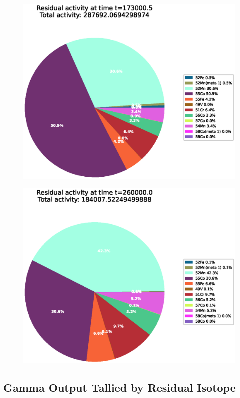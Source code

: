\begin{figure}[!htb]
\centering
\includegraphics[width=0.8\linewidth]{chapters/results_activity_code/fe-activity-v2/residual-activity/0233_173000.eps}
\caption{}
\label{fig:activity-v2-residual-activity-173000s}
\end{figure}

\begin{figure}[!htb]
\centering
\includegraphics[width=0.8\linewidth]{chapters/results_activity_code/fe-activity-v2/residual-activity/0300_260000.eps}
\caption{}
\label{fig:activity-v2-residual-activity-260000s}
\end{figure}



\clearpage

\subsection{Gamma Output Tallied by Residual Isotope}

